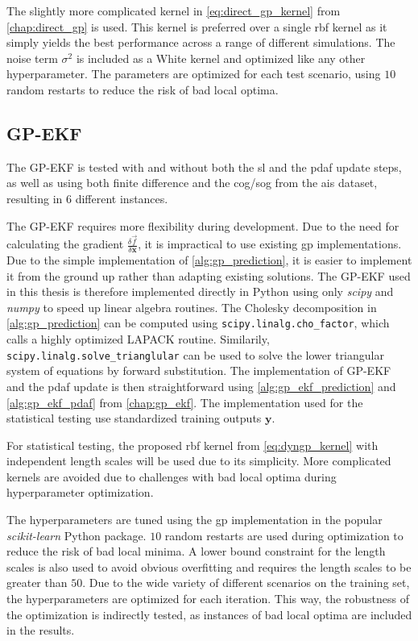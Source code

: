 The slightly more complicated kernel in \cref{eq:direct_gp_kernel} from \cref{chap:direct_gp} is used. This kernel is preferred over a single \acrshort{rbf} kernel as it simply yields the best performance across a range of different simulations. The noise term $\sigma^2$ is included as a White kernel and optimized like any other hyperparameter. The parameters are optimized for each test scenario, using $10$ random restarts to reduce the risk of bad local optima.

\subsection{GP-EKF}
The GP-EKF is tested with and without both the \acrshort{sl} and the \acrshort{pdaf} update steps, as well as using both finite difference and the \acrshort{cog}/\acrshort{sog} from the \acrshort{ais} dataset, resulting in $6$ different instances.

The GP-EKF requires more flexibility during development. Due to the need for calculating the gradient $\frac{\delta \vec{f}}{\delta \boldsymbol{x}}$, it is impractical to use existing \acrshort{gp} implementations. Due to the simple implementation of \cref{alg:gp_prediction}, it is easier to implement it from the ground up rather than adapting existing solutions.
The GP-EKF used in this thesis is therefore implemented directly in Python using only \textit{scipy}\cite{scipy} and \textit{numpy}\cite{numpy} to speed up linear algebra routines. The Cholesky decomposition in \cref{alg:gp_prediction} can be computed using \texttt{scipy.linalg.cho\_factor}, which calls a highly optimized LAPACK routine. Similarily, \texttt{scipy.linalg.solve\_\-trianglular} can be used to solve the lower triangular system of equations by forward substitution. The implementation of GP-EKF and the \acrshort{pdaf} update is then straightforward using \cref{alg:gp_ekf_prediction} and \cref{alg:gp_ekf_pdaf} from \cref{chap:gp_ekf}. The implementation used for the statistical testing use standardized training outputs $\boldsymbol{y}$.

For statistical testing, the proposed \acrshort{rbf} kernel from \cref{eq:dyngp_kernel} with independent length scales will be used due to its simplicity. More complicated kernels are avoided due to challenges with bad local optima during hyperparameter optimization.

The hyperparameters are tuned using the \acrshort{gp} implementation in the popular \textit{scikit-learn} \cite{scikit-learn} Python package. $10$ random restarts are used during optimization to reduce the risk of bad local minima. A lower bound constraint for the length scales is also used to avoid obvious overfitting and requires the length scales to be greater than $50$. Due to the wide variety of different scenarios on the training set, the hyperparameters are optimized for each iteration. This way, the robustness of the optimization is indirectly tested, as instances of bad local optima are included in the results.


